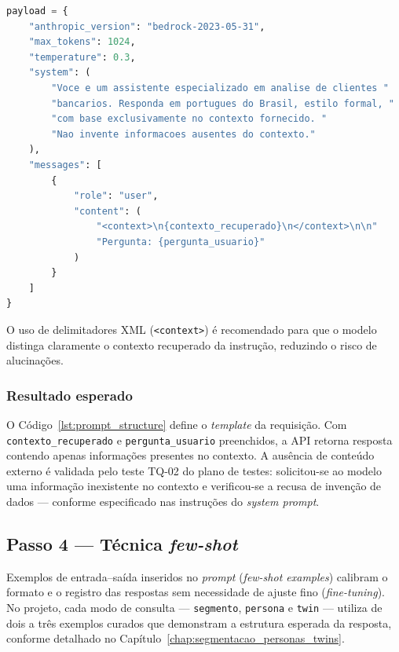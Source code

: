 \begin{lstlisting}[language=Python,
  caption={Estrutura de \textit{system prompt} e mensagem de usu\'ario.},
  label={lst:prompt_structure}]
payload = {
    "anthropic_version": "bedrock-2023-05-31",
    "max_tokens": 1024,
    "temperature": 0.3,
    "system": (
        "Voce e um assistente especializado em analise de clientes "
        "bancarios. Responda em portugues do Brasil, estilo formal, "
        "com base exclusivamente no contexto fornecido. "
        "Nao invente informacoes ausentes do contexto."
    ),
    "messages": [
        {
            "role": "user",
            "content": (
                "<context>\n{contexto_recuperado}\n</context>\n\n"
                "Pergunta: {pergunta_usuario}"
            )
        }
    ]
}
\end{lstlisting}

O uso de delimitadores XML (\texttt{<context>}) \'e recomendado para
que o modelo distinga claramente o contexto recuperado da
instru\c{c}\~ao, reduzindo o risco de alucina\c{c}\~oes.

\subsubsection*{Resultado esperado}

O C\'odigo~\ref{lst:prompt_structure} define o \textit{template} da
requisi\c{c}\~ao. Com \texttt{contexto\_recuperado} e
\texttt{pergunta\_usuario} preenchidos, a API retorna resposta
contendo apenas informa\c{c}\~oes presentes no contexto. A aus\^encia
de conte\'udo externo \'e validada pelo teste TQ-02 do plano de
testes: solicitou-se ao modelo uma informa\c{c}\~ao inexistente no
contexto e verificou-se a recusa de inven\c{c}\~ao de dados ---
conforme especificado nas instru\c{c}\~oes do \textit{system prompt}.

\subsection{Passo 4 --- T\'ecnica \textit{few-shot}}

Exemplos de entrada--sa\'ida inseridos no \textit{prompt}
(\textit{few-shot examples}) calibram o formato e o registro das
respostas sem necessidade de ajuste fino (\textit{fine-tuning}). No
projeto, cada modo de consulta --- \texttt{segmento}, \texttt{persona}
e \texttt{twin} --- utiliza de dois a tr\^es exemplos curados que
demonstram a estrutura esperada da resposta, conforme detalhado no
Cap\'itulo~\ref{chap:segmentacao_personas_twins}.

